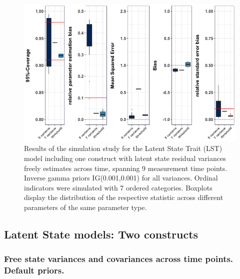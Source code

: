  \begin{figure}[H]
 \begin{adjustwidth}{-1cm}{-1cm}
    \begin{center}
  \includegraphics[width=1\textwidth]{Boxplot_LST_free_IGprior.png}
   \end{center}
    \end{adjustwidth}
      \captionsetup{skip=10pt,width=1.05\textwidth}
\caption[Results LST free variance IG]{Results of the simulation study for the Latent State Trait (LST) model including one construct with latent state residual variances freely estimates across time, spanning 9 measurement time points. Inverse gamma priors IG(0.001,0.001) for all variances. Ordinal indicators were simulated with 7 ordered categories. Boxplots display the distribution of the respective statistic across different parameters of the same parameter type.}
\label{Fig: LST one free IG}
\end{figure}

\subsection{Latent State models: Two constructs}
 \subsubsection{Free state variances and covariances across time points. Default priors.}

